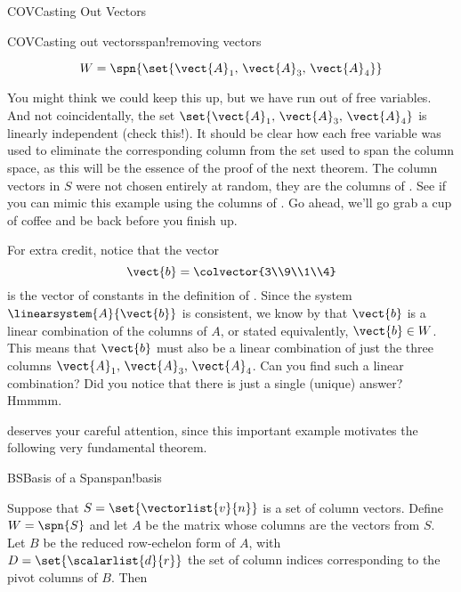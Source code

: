 \begin{subsect}{COV}{Casting Out Vectors}
\begin{example}{COV}{Casting out vectors}{span!removing vectors}
\begin{para}
%
\begin{equation*}
W=\spn{\set{\vect{A}_1,\,\vect{A}_3,\,\vect{A}_4}}
\end{equation*}
\end{para}
%
\begin{para}You might think we could keep this up, but we have run out of free variables.  And not coincidentally, the set $\set{\vect{A}_1,\,\vect{A}_3,\,\vect{A}_4}$ is linearly independent (check this!).  It should be clear how each free variable was used to eliminate the corresponding column from the set used to span the column space, as this will be the essence of the proof of the next theorem.  The column vectors in $S$ were not chosen entirely at random, they are the columns of .  See if you can mimic this example using the columns of .  Go ahead, we'll go grab a cup of coffee and be back before you finish up.\end{para}
%
\begin{para}For extra credit, notice that the vector
%
\begin{equation*}
\vect{b}=\colvector{3\\9\\1\\4}
\end{equation*}
%
is the vector of constants in the definition of .  Since the system $\linearsystem{A}{\vect{b}}$ is consistent, we know by  that $\vect{b}$ is a linear combination of the columns of $A$, or stated equivalently, $\vect{b}\in W$.  This means that $\vect{b}$ must also be a linear combination of just the three columns $\vect{A}_1,\,\vect{A}_3,\,\vect{A}_4$.  Can you find such a linear combination?  Did you notice that there is just a single (unique) answer?  Hmmmm.\end{para}
%
\end{example}
%
%
\begin{para} deserves your careful attention, since this important example motivates the following very fundamental theorem.\end{para}
%
\begin{theorem}{BS}{Basis of a Span}{span!basis}
\begin{para}Suppose that $S=\set{\vectorlist{v}{n}}$ is a set of column vectors.  Define $W=\spn{S}$ and let $A$ be the matrix whose columns are the vectors from $S$.  Let $B$ be the reduced row-echelon form of $A$, with $D=\set{\scalarlist{d}{r}}$ the set of column indices corresponding to the pivot columns of $B$.  Then

\end{para}
\end{theorem}
\end{subsect}

